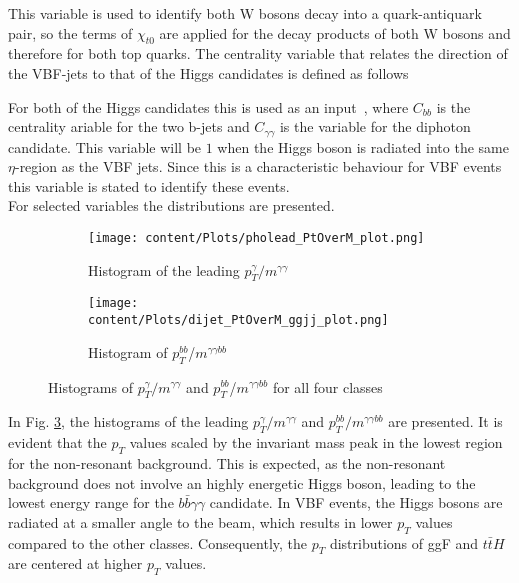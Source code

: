 This variable is used to identify both W bosons decay into a quark-antiquark pair, so the terms of $\chi_{t0}$ are applied for the decay products of both W bosons and therefore for both top quarks.
The centrality variable that relates the direction of the VBF-jets to that of the Higgs candidates is defined as follows


For both of the Higgs candidates this is used as an input~\cite{CMS:2021qbp}, where $C_{bb}$ is the centrality ariable for the two b-jets and $C_{\gamma \gamma}$ is the variable for the diphoton candidate.
This variable will be $1$ when the Higgs boson is radiated into the same $\eta$-region as the VBF jets. Since this is a characteristic
behaviour for VBF events this variable is stated to identify these events. \\

For selected variables the distributions are presented.

\begin{figure}[htbp]
    \centering
    \begin{subfigure}{0.45\textwidth}
        \centering
        \texttt{[image: content/Plots/pholead\_PtOverM\_plot.png]}
        \caption{Histogram of the leading $p_T^{\gamma}/m^{\gamma \gamma}$}
        \label{fig:roc1}
    \end{subfigure}
    \hfill
    \begin{subfigure}{0.45\textwidth}
        \centering
        \texttt{[image: content/Plots/dijet\_PtOverM\_ggjj\_plot.png]}
        \caption{Histogram of $p_T^{bb}$/$m^{\gamma \gamma bb}$}
        \label{fig:roc2}
    \end{subfigure}
    \caption{Histograms of $p_T^{\gamma}/m^{\gamma \gamma}$ and $p_T^{bb}$/$m^{\gamma \gamma bb}$ for all four classes}
    \label{fig:18}
\end{figure}

In Fig. \ref{fig:18}, the histograms of the leading $p_T^{\gamma}/m^{\gamma \gamma}$ and $p_T^{bb}/m^{\gamma \gamma bb}$ are presented. It is evident that the $p_T$ values
scaled by the invariant mass peak in the lowest region for the non-resonant background. This is expected, as the non-resonant background does not involve an highly energetic
Higgs boson, leading to the lowest energy range for the $b \bar{b} \gamma \gamma$ candidate. In VBF events, the Higgs bosons are radiated at a smaller angle to the beam, which
results in lower $p_T$ values compared to the other classes. Consequently, the $p_T$ distributions of ggF and $t \bar{t} H$ are centered at higher $p_T$ values.

